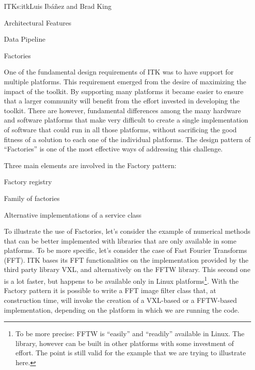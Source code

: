 \begin{aosachapter}{ITK}{s:itk}{Luis Ib\'{a}\~{n}ez and Brad King}
\begin{aosasect1}{Architectural Features}
\begin{aosasect2}{Data Pipeline}

\end{aosasect2}

\begin{aosasect2}{Factories}

One of the fundamental design requirements of ITK was to have support for
multiple platforms. This requirement emerged from the desire of maximizing the
impact of the toolkit. By supporting many platforms it became easier to ensure
that a larger community will benefit from the effort invested in developing the
toolkit. There are however, fundamental differences among the many hardware and
software platforms that make very difficult to create a single implementation
of software that could run in all those platforms, without sacrificing the good
fitness of a solution to each one of the individual platforms. The design
pattern of ``Factories'' is one of the most effective ways of addressing this
challenge.

Three main elements are involved in the Factory pattern:

\begin{aosaitemize}
\item Factory registry
\item Family of factories
\item Alternative implementations of a service class
\end{aosaitemize}


To illustrate the use of Factories, let's consider the example of numerical
methods that can be better implemented with libraries that are only available
in some platforms. To be more specific, let's consider the case of Fast Fourier
Transforms (FFT). ITK bases its FFT functionalities on the implementation
provided by the third party library VXL, and alternatively on the FFTW library.
This second one is a lot faster, but happens to be available only in Linux
platforms\footnote{To be more precise: FFTW is ``easily'' and ``readily''
available in Linux. The library, however can be built in other platforms with
some investment of effort. The point is still valid for the example that we are
trying to illustrate here.}. With the Factory pattern it is possible to write a
FFT image filter class that, at construction time, will invoke the creation of
a VXL-based or a FFTW-based implementation, depending on the platform in which
we are running the code.


\end{aosasect2}
\end{aosasect1}
\end{aosachapter}
